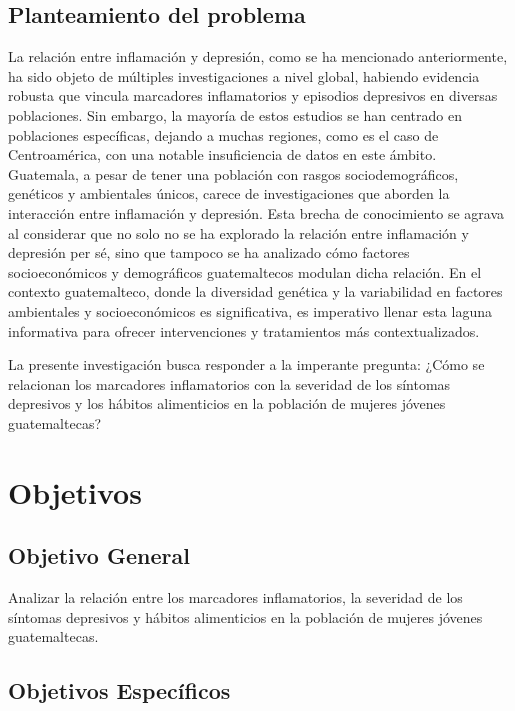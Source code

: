 \documentclass[stu, 12pt]{apa7}
\begin{document}
	\subsection{Planteamiento del problema}

	La relación entre inflamación y depresión, como se ha mencionado anteriormente, ha sido objeto de múltiples
	investigaciones a nivel global, habiendo evidencia robusta que vincula
	marcadores inflamatorios y episodios depresivos en diversas poblaciones.
	Sin embargo, la mayoría de estos estudios se han centrado en poblaciones
	específicas, dejando a muchas regiones, como es el caso de Centroamérica, con una
	notable insuficiencia de datos en este ámbito.\\

	Guatemala, a pesar de tener una población con rasgos sociodemográficos,
	genéticos y ambientales únicos, carece de investigaciones que aborden la
	interacción entre inflamación y depresión. Esta brecha de conocimiento
	se agrava al considerar que no solo no se ha explorado la relación entre
	inflamación y depresión per sé, sino que tampoco se ha analizado cómo
	factores socioeconómicos y demográficos guatemaltecos modulan dicha
	relación. En el contexto guatemalteco, donde la diversidad genética y la
	variabilidad en factores ambientales y socioeconómicos es significativa,
	es imperativo llenar esta laguna informativa para ofrecer intervenciones
	y tratamientos más contextualizados.

	La presente investigación busca responder a la imperante pregunta: ¿Cómo
	se relacionan los marcadores inflamatorios con la severidad de los
	síntomas depresivos y los hábitos alimenticios en la población de
	mujeres jóvenes guatemaltecas?

	\section{Objetivos}\label{objetivos}

	\subsection{Objetivo General}\label{objetivo-general}

	Analizar la relación entre los marcadores inflamatorios, la severidad de
	los síntomas depresivos y hábitos alimenticios en la población de
	mujeres jóvenes guatemaltecas.

	\subsection{Objetivos Específicos}\label{objetivos-especuxedficos}
\end{document}

